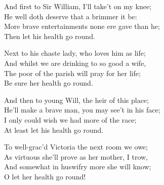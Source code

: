 \settowidth{\versewidth}{He’ll make a brave man, you may see’t in his face;}
\begin{dcverse}\begin{patverse}
And first to Sir William, I’ll take’t on my knee;\\
He well doth deserve that a brimmer it be:\\
More brave entertainments none ere gave than he;\\
Then let his health go round.
\end{patverse}

\begin{patverse}
Next to his chaste lady, who loves him as life;\\
And whilst we are drinking to so good a wife,\\
The poor of the parish will pray for her life;\\
Be sure her health go round.
\end{patverse}

\begin{patverse}
And then to young Will, the heir of this place;\\
He’ll make a brave man, you may see’t in his face;\\
I only could wish we had more of the race;\\
At least let his health go round.
\end{patverse}

\begin{patverse}
To well-grac’d Victoria the next room we owe;\\
As virtuous she’ll prove as her mother, I trow,\\
And somewhat in huswifry more she will know;\\
O let her health go round!
\end{patverse}
\end{dcverse}
\pagebreak

